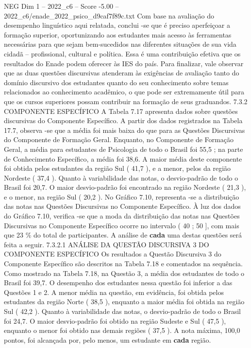 \begin{textsample}{NEG Dim 1 – 2022\_c6 – Score -5.00 – 2022\_c6/enade\_2022\_psico\_d9caf7f89c.txt}
Com base na avaliação do desempenho linguístico aqui relatada, conclui -se que é preciso aperfeiçoar a formação superior, oportunizando aos estudantes mais acesso às ferramentas necessárias para que sejam bem-sucedidos nas diferentes situações de sua vida cidadã – profissional, cultural e política.
Essa é uma contribuição efetiva que os resultados do Enade podem oferecer às IES do país.
Para finalizar, vale observar que as duas questões discursivas atenderam às exigências de avaliação tanto do domínio discursivo dos estudantes quanto do seu conhecimento sobre temas relacionados ao conhecimento acadêmico, o que pode ser extremamente útil para que os cursos superiores possam contribuir na formação de seus graduandos. 7.3.2 COMPONENTE ESPECÍFICO A Tabela 7.17 apresenta dados sobre questões discursivas do Componente Específico.
A partir dos dados registrados na Tabela 17.7, observa -se que a média foi mais baixa do que para as Questões Discursivas do Componente de Formação Geral.
Enquanto, no Componente de Formação Geral, a média para estudantes de Psicologia de todo o Brasil foi 55,5 ; na parte de Conhecimento Específico, a média foi 38,6.
A maior média deste componente foi obtida pelos estudantes da região Sul ( 41,7 ), e a menor, pelos da região Nordeste ( 37,4 ).
Quanto à variabilidade das notas, o desvio-padrão de todo o Brasil foi 20,7.
O maior desvio-padrão foi encontrado na região Nordeste ( 21,3 ), e o menor, na região Sul ( 20,2 ).
No Gráfico 7.10, representa -se a distribuição das notas nas Questões Discursivas no Componente Específico.
À luz dos dados do Gráfico 7.10, verifica -se que a moda da distribuição das notas nas Questões Discursivas no Componente Específico ocorre no intervalo ( 40 ; 50 ], com mais que 23 \% do total de participantes.
A análise de \textbf{cada} uma destas questões será feita a seguir. 7.3.2.1 ANÁLISE DA QUESTÃO DISCURSIVA 3 DO COMPONENTE ESPECÍFICO Os resultados a Questão Discursiva 3 do Componente Específico são descritos na Tabela 7.18 e comentados na sequência.
Como mostrado na Tabela 7.18, na Questão 3, a média dos estudantes de todo o Brasil foi 39,7.
O desempenho dos estudantes nessa questão foi inferior a das Questões 1 e 2.
A menor média na questão, em evidência, foi obtida pelos estudantes da região Norte ( 38,5 ), enquanto a maior média foi obtida na região Sul ( 42,2 ).
Quanto à variabilidade das notas, o desvio-padrão de todo o Brasil foi 24,7.
O maior desvio-padrão foi obtido na região Sudeste e Sul ( 47,5 ), enquanto o menor foi obtido nas demais regiões ( 37,5 ).
A nota máxima, 100,0 pontos, foi alcançada por, pelo menos, um estudante em \textbf{cada} região.

\end{textsample}

